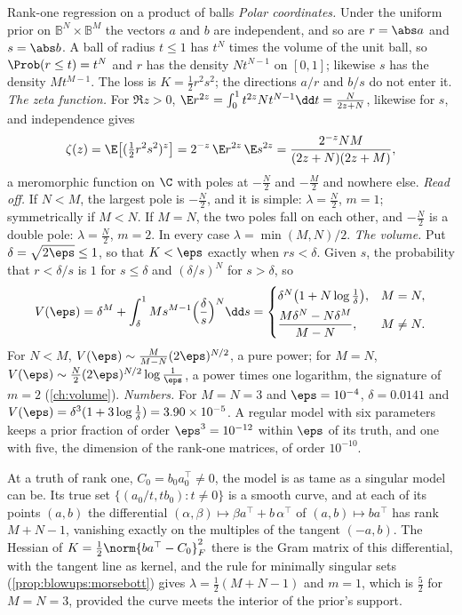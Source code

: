 \begin{refsection}
\begin{computation}{Rank-one regression on a product of balls}\label{comp:catalogue:balls}
\step \emph{Polar coordinates.} Under the uniform prior on $\mathbb B^N\times\mathbb B^M$ the vectors $a$ and $b$ are independent, and so are $r=\abs a$ and $s=\abs b$. A ball of radius $t\le1$ has $t^N$ times the volume of the unit ball, so $\Prob(r\le t)=t^N$ and $r$ has the density $Nt^{N-1}$ on $[0,1]$; likewise $s$ has the density $Mt^{M-1}$. The loss is $K=\tfrac12r^2s^2$; the directions $a/r$ and $b/s$ do not enter it.
\step \emph{The zeta function.} For $\Re z>0$, $\E r^{2z}=\int_0^1t^{2z}Nt^{N-1}\dd t=\frac N{2z+N}$, likewise for $s$, and independence gives
\[
\zeta(z)=\E\bigl[(\tfrac12r^2s^2)^z\bigr]=2^{-z}\,\E r^{2z}\,\E s^{2z}=\frac{2^{-z}NM}{(2z+N)(2z+M)},
\]
a meromorphic function on $\C$ with poles at $-\tfrac N2$ and $-\tfrac M2$ and nowhere else.
\step \emph{Read off.} If $N<M$, the largest pole is $-\tfrac N2$, and it is simple: $\lambda=\tfrac N2$, $m=1$; symmetrically if $M<N$. If $M=N$, the two poles fall on each other, and $-\tfrac N2$ is a double pole: $\lambda=\tfrac N2$, $m=2$. In every case $\lambda=\min(M,N)/2$.
\step \emph{The volume.} Put $\delta=\sqrt{2\eps}\le1$, so that $K<\eps$ exactly when $rs<\delta$. Given $s$, the probability that $r<\delta/s$ is $1$ for $s\le\delta$ and $(\delta/s)^N$ for $s>\delta$, so
\[
V(\eps)=\delta^M+\int_\delta^1Ms^{M-1}\Bigl(\frac\delta s\Bigr)^N\dd s=\begin{cases}\delta^N\bigl(1+N\log\frac1\delta\bigr), & M=N,\\[0.8ex] \dfrac{M\delta^N-N\delta^M}{M-N}, & M\ne N.\end{cases}
\]
For $N<M$, $V(\eps)\sim\frac M{M-N}(2\eps)^{N/2}$, a pure power; for $M=N$, $V(\eps)\sim\frac N2(2\eps)^{N/2}\log\frac1\eps$, a power times one logarithm, the signature of $m=2$ (\cref{ch:volume}).
\step \emph{Numbers.} For $M=N=3$ and $\eps=10^{-4}$, $\delta=0.0141$ and $V(\eps)=\delta^3(1+3\log\frac1\delta)=3.90\times10^{-5}$. A regular model with six parameters keeps a prior fraction of order $\eps^3=10^{-12}$ within $\eps$ of its truth, and one with five, the dimension of the rank-one matrices, of order $10^{-10}$.
\end{computation}

At a truth of rank one, $C_0=b_0a_0^\top\ne0$, the model is as tame as a singular model can be. Its true set $\{(a_0/t,tb_0):t\ne0\}$ is a smooth curve, and at each of its points $(a,b)$ the differential $(\alpha,\beta)\mapsto\beta a^\top+b\,\alpha^\top$ of $(a,b)\mapsto ba^\top$ has rank $M+N-1$, vanishing exactly on the multiples of the tangent $(-a,b)$. The Hessian of $K=\tfrac12\norm{ba^\top-C_0}_F^2$ there is the Gram matrix of this differential, with the tangent line as kernel, and the rule for minimally singular sets (\cref{prop:blowups:morsebott}) gives $\lambda=\tfrac12(M+N-1)$ and $m=1$, which is $\tfrac52$ for $M=N=3$, provided the curve meets the interior of the prior's support.


\end{refsection}
